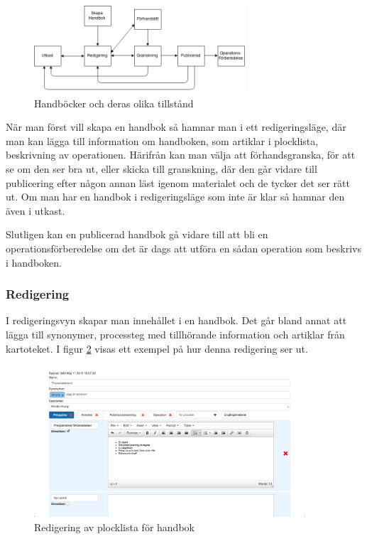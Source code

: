 \begin{figure}[H]
  \centering
  \includegraphics[width=0.7\textwidth]{images/model}
  \caption{Handböcker och deras olika tillstånd}
  \label{fig:model}
\end{figure}

När man först vill skapa en handbok så hamnar man i ett redigeringsläge,
där man kan lägga till information om handboken, som artiklar i plocklista,
beskrivning av operationen. Härifrån kan man välja att förhandsgranska, för att se om den ser bra ut,
eller skicka till granskning, där den går vidare till publicering
efter någon annan läst igenom materialet och de tycker det ser rätt ut.
Om man har en handbok i redigeringsläge som inte är klar så hamnar den även i
utkast.

Slutligen kan en publicerad handbok gå vidare till att bli en
operationsförberedelse om det är dags att utföra en sådan operation
som beskrivs i handboken.

\subsubsection{Redigering}
I redigeringsvyn skapar man innehållet i en handbok. Det går bland annat att lägga till synonymer, processteg med tillhörande information och artiklar från kartoteket. I figur \ref{fig:handboksredigering} visas ett exempel på hur denna redigering ser ut. 

\begin{figure}[H]
  \centering
  \includegraphics[width=0.9\textwidth]{images/site/handboksredigering}
  \caption{Redigering av plocklista för handbok}
  \label{fig:handboksredigering}
\end{figure}


